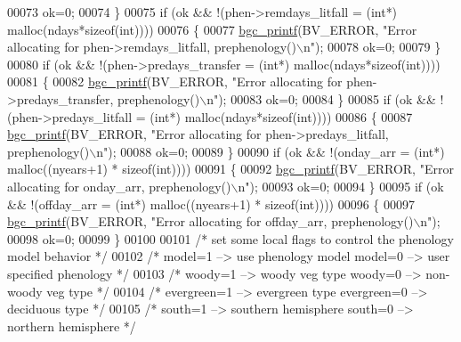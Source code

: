 \begin{DoxyCode}
00073         ok=0;
00074     \}
00075     \textcolor{keywordflow}{if} (ok && !(phen->remdays\_litfall = (\textcolor{keywordtype}{int}*) malloc(ndays*\textcolor{keyword}{sizeof}(\textcolor{keywordtype}{int}))))
00076     \{
00077         \hyperlink{bgc__io_8c_af287cce6e2aede1ce337de9319e80d0d}{bgc\_printf}(BV\_ERROR, \textcolor{stringliteral}{"Error allocating for phen->remdays\_litfall, prephenology()\(\backslash\)n"});
00078         ok=0;
00079     \}
00080     \textcolor{keywordflow}{if} (ok && !(phen->predays\_transfer = (\textcolor{keywordtype}{int}*) malloc(ndays*\textcolor{keyword}{sizeof}(\textcolor{keywordtype}{int}))))
00081     \{
00082         \hyperlink{bgc__io_8c_af287cce6e2aede1ce337de9319e80d0d}{bgc\_printf}(BV\_ERROR, \textcolor{stringliteral}{"Error allocating for phen->predays\_transfer, prephenology()\(\backslash\)n"});
00083         ok=0;
00084     \}
00085     \textcolor{keywordflow}{if} (ok && !(phen->predays\_litfall = (\textcolor{keywordtype}{int}*) malloc(ndays*\textcolor{keyword}{sizeof}(\textcolor{keywordtype}{int}))))
00086     \{
00087         \hyperlink{bgc__io_8c_af287cce6e2aede1ce337de9319e80d0d}{bgc\_printf}(BV\_ERROR, \textcolor{stringliteral}{"Error allocating for phen->predays\_litfall, prephenology()\(\backslash\)n"});
00088         ok=0;
00089     \}
00090     \textcolor{keywordflow}{if} (ok && !(onday\_arr = (\textcolor{keywordtype}{int}*) malloc((nyears+1) * \textcolor{keyword}{sizeof}(\textcolor{keywordtype}{int}))))
00091     \{
00092         \hyperlink{bgc__io_8c_af287cce6e2aede1ce337de9319e80d0d}{bgc\_printf}(BV\_ERROR, \textcolor{stringliteral}{"Error allocating for onday\_arr, prephenology()\(\backslash\)n"});
00093         ok=0;
00094     \}
00095     \textcolor{keywordflow}{if} (ok && !(offday\_arr = (\textcolor{keywordtype}{int}*) malloc((nyears+1) * \textcolor{keyword}{sizeof}(\textcolor{keywordtype}{int}))))
00096     \{
00097         \hyperlink{bgc__io_8c_af287cce6e2aede1ce337de9319e80d0d}{bgc\_printf}(BV\_ERROR, \textcolor{stringliteral}{"Error allocating for offday\_arr, prephenology()\(\backslash\)n"});
00098         ok=0;
00099     \}
00100     
00101     \textcolor{comment}{/* set some local flags to control the phenology model behavior */}
00102     \textcolor{comment}{/* model=1 --> use phenology model   model=0 --> user specified phenology */}
00103     \textcolor{comment}{/* woody=1 --> woody veg type        woody=0 --> non-woody veg type */}
00104     \textcolor{comment}{/* evergreen=1 --> evergreen type    evergreen=0 --> deciduous type */}
00105     \textcolor{comment}{/* south=1 --> southern hemisphere   south=0 --> northern hemisphere */}

\end{DoxyCode}

